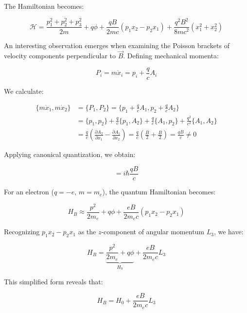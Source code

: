 The Hamiltonian becomes:

\begin{equation}
\mathcal{H}=\frac{p_{1}^{2}+p_{2}^{2}+p_{3}^{2}}{2m}+q\phi+\frac{qB}{2mc}(p_{1}x_{2}-p_{2}x_{1})+\frac{q^{2}B^{2}}{8mc^{2}}(x_{1}^{2}+x_{2}^{2})
\end{equation}

An interesting observation emerges when examining the Poisson brackets of velocity components perpendicular to $\vec{B}$. Defining mechanical momenta:

\begin{equation}
P_{i}=m\dot{x}_{i}=p_{i}+\frac{q}{c}A_{i}
\end{equation}

We calculate:

\begin{align}
\{m\dot{x}_{1},m\dot{x}_{2}\} &= \{P_{1},P_{2}\}=\{p_{1}+\frac{q}{c}A_{1},p_{2}+\frac{q}{c}A_{2}\}\\
&= \{p_{1},p_{2}\}+\frac{q}{c}\{p_{1},A_{2}\}+\frac{q}{c}\{A_{1},p_{2}\}+\frac{q^{2}}{c^{2}}\{A_{1},A_{2}\}\\
&= \frac{q}{c}(\frac{\partial A_{2}}{\partial x_{1}}-\frac{\partial A_{1}}{\partial x_{2}})=\frac{q}{c}(\frac{B}{2}+\frac{B}{2})=\frac{qB}{c}\neq 0
\end{align}

Applying canonical quantization, we obtain:

\begin{equation}
[P_{1},P_{2}]=i\hbar\frac{qB}{c}
\end{equation}

For an electron ($q=-e$, $m=m_e$), the quantum Hamiltonian becomes:

\begin{equation}
H_{B}\approx\frac{p^{2}}{2m_e}+q\phi+\frac{eB}{2m_e c}(p_{1}x_{2}-p_{2}x_{1})
\end{equation}

Recognizing $p_{1}x_{2}-p_{2}x_{1}$ as the $z$-component of angular momentum $L_3$, we have:

\begin{equation}
H_{B}=\underbrace{\frac{p^{2}}{2m_e}+q\phi}_{H_0}+\frac{eB}{2m_e c}L_3
\end{equation}

This simplified form reveals that:

\begin{equation}
H_{B}=H_0+\frac{eB}{2m_e c}L_3
\end{equation}

